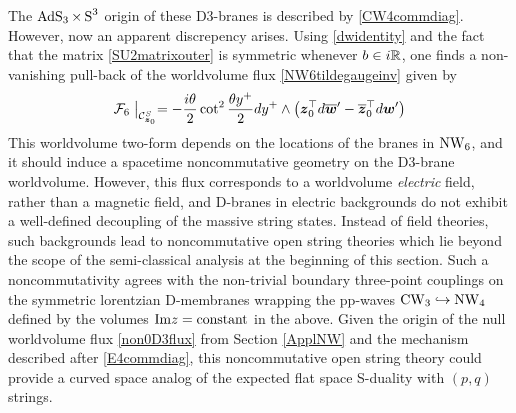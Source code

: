 The $\operatorname{AdS}_3\times\operatorname{S}^3$ origin of these D3-branes is described by
\eqref{CW4commdiag}. However, now an apparent discrepency arises. Using
\eqref{dwidentity} and the fact that the matrix \eqref{SU2matrixouter} is
symmetric whenever $b\in i{\mathbb R}$, one finds a non-vanishing pull-back of the
worldvolume flux \eqref{NW6tildegaugeinv} given by
\begin{equation}
  \label{non0D3flux}
  \mathcal{F}_6\bigm|_{\mathcal{C}_{{{\boldsymbol {z} }}_0}^S}=- \frac{ i\theta}2  
  \cot^2 \frac{\theta y^+}2   d y^+\wedge\left({{\boldsymbol {z} }}_0^\top 
    d\overline{{{\boldsymbol {w} }}}^{ \prime}-\overline{{{\boldsymbol {z} }}}_0^{ \top} 
    d{{\boldsymbol {w} }}' \right)
\end{equation}
This worldvolume two-form depends on the locations of the branes in $\operatorname{NW}_6$, and
it should induce a spacetime noncommutative geometry on the D3-brane
worldvolume. However, this flux corresponds to a worldvolume {\it electric}
field, rather than a magnetic field, and D-branes in electric backgrounds do not
exhibit a well-defined decoupling of the massive string states. Instead of field
theories, such backgrounds lead to noncommutative open string theories
\cite{GMMS1,SST1} which lie beyond the scope of the semi-classical analysis at
the beginning of this section. Such a noncommutativity agrees with the
non-trivial boundary three-point couplings \cite{DK2} on the symmetric
lorentzian D-membranes \cite{FS1} wrapping the pp-waves
$\operatorname{CW}_3\hookrightarrow\operatorname{NW}_4$ defined by the volumes ${\rm Im} z={\rm constant}$
in the above. Given the origin of the null worldvolume flux \eqref{non0D3flux}
from Section \ref{ApplNW} and the mechanism described after \eqref{E4commdiag},
this noncommutative open string theory could provide a curved space analog of
the expected flat space S-duality with $(p,q)$ strings.

